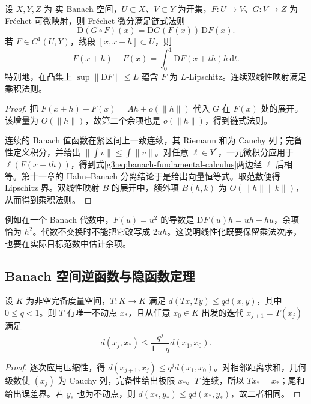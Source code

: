 \begin{proposition}\label{g3:prop:banach-calculus}
	设 \(X,Y,Z\) 为 实 Banach 空间，\(U\subset X\)、\(V\subset Y\) 为开集，\(F:U\to V\)、\(G:V\to Z\) 为 Fréchet 可微映射，则 Fréchet 微分满足链式法则
	\[
		\mathrm D(G\circ F)(x)=\mathrm DG(F(x))\,\mathrm DF(x).
	\]
	若 \(F\in C^1(U,Y)\)，线段 \([x,x+h]\subset U\)，则
	\begin{equation}\label{g3:eq:banach-fundamental-calculus}
		F(x+h)-F(x)=\int_0^1\mathrm DF(x+th)h\,\mathrm dt.
	\end{equation}
	特别地，在凸集上 \(\sup\|\mathrm DF\|\le L\) 蕴含 \(F\) 为 \(L\)-Lipschitz。连续双线性映射满足乘积法则。
\end{proposition}
\begin{proof}
	把 \(F(x+h)-F(x)=Ah+o(\|h\|)\) 代入 \(G\) 在 \(F(x)\) 处的展开。该增量为 \(O(\|h\|)\)，故第二个余项也是 \(o(\|h\|)\)，得到链式法则。

	连续的 Banach 值函数在紧区间上一致连续，其 Riemann 和为 Cauchy 列；完备性定义积分，并给出 \(\|\int v\|\le\int\|v\|\)。对任意 \(\ell\in Y^*\)，一元微积分应用于 \(\ell(F(x+th))\)，得到式\eqref{g3:eq:banach-fundamental-calculus}两边经 \(\ell\) 后相等。第十一章的 Hahn--Banach 分离结论于是给出向量恒等式。取范数便得 Lipschitz 界。双线性映射 \(B\) 的展开中，额外项 \(B(h,k)\) 为 \(O(\|h\|\|k\|)\)，从而得到乘积法则。
\end{proof}

例如在一个 Banach 代数中，\(F(u)=u^2\) 的导数是 \(\mathrm DF(u)h=uh+hu\)，余项恰为 \(h^2\)。代数不交换时不能把它改写成 \(2uh\)。这说明线性化既要保留乘法次序，也要在实际目标范数中估计余项。

\subsection{Banach 空间逆函数与隐函数定理}
\label{g3:subsec:1305:02}
\begin{lemma}[压缩映射原理]\label{g3:lem:banach-contraction}
	设 \(K\) 为非空完备度量空间，\(T:K\to K\) 满足
	\(d(Tx,Ty)\le qd(x,y)\)，其中 \(0\le q<1\)。则 \(T\) 有唯一不动点 \(x_*\)，且从任意 \(x_0\in K\) 出发的迭代 \(x_{j+1}=T(x_j)\) 满足
	\[
		d(x_j,x_*)\le\frac{q^j}{1-q}d(x_1,x_0).
	\]
\end{lemma}
\begin{proof}
	逐次应用压缩性，得 \(d(x_{j+1},x_j)\le q^j d(x_1,x_0)\)。对相邻距离求和，几何级数使 \((x_j)\) 为 Cauchy 列，完备性给出极限 \(x_*\)。\(T\) 连续，所以 \(Tx_*=x_*\)；尾和给出误差界。若 \(y_*\) 也为不动点，则 \(d(x_*,y_*)\le qd(x_*,y_*)\)，故二者相同。
\end{proof}


